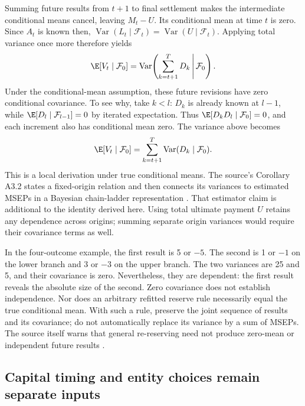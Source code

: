 Summing future results from $t+1$ to final settlement makes the intermediate
conditional means cancel, leaving $M_t-U$. Its conditional mean at time $t$
is zero. Since $A_t$ is known then,
$\operatorname{Var}(L_t\mid\mathcal F_t)=\operatorname{Var}(U\mid\mathcal F_t)$.
Applying total variance once more therefore yields
\[
 \E[V_t\mid\mathcal F_0]
 =\operatorname{Var}\!\left(\sum_{k=t+1}^{T}D_k
                   \,\middle|\,\mathcal F_0\right).
\]
Under the conditional-mean assumption, these future revisions have zero
conditional covariance. To see why, take $k<l$: $D_k$ is already known at
$l-1$, while $\E[D_l\mid\mathcal F_{l-1}]=0$ by iterated expectation.
Thus $\E[D_kD_l\mid\mathcal F_0]=0$, and each increment also has conditional
mean zero. The variance above becomes
\[
 \E[V_t\mid\mathcal F_0]
 =\sum_{k=t+1}^{T}\operatorname{Var}(D_k\mid\mathcal F_0).
\]
This is a local derivation under true conditional means. The source's
Corollary A3.2 states a fixed-origin relation and then connects its variances
to estimated MSEPs in a Bayesian chain-ladder representation
\citep[Appendix 3]{england2019lifetime}. That estimator claim is additional
to the identity derived here. Using total ultimate payment $U$ retains any
dependence across origins; summing separate origin variances would require
their covariance terms as well.

In the four-outcome example, the first result is 5 or $-5$. The second is
1 or $-1$ on the lower branch and 3 or $-3$ on the upper branch. The two
variances are 25 and 5, and their covariance is zero. Nevertheless, they
are dependent: the first result reveals the absolute size of the second.
Zero covariance does not establish independence. Nor does an arbitrary
refitted reserve rule necessarily equal the true conditional mean. With
such a rule, preserve the joint sequence of results and its covariance;
do not automatically replace its variance by a sum of MSEPs. The source
itself warns that general re-reserving need not produce zero-mean or
independent future results \citep[Section 7]{england2019lifetime}.

\subsection{Capital timing and entity choices remain separate inputs}

